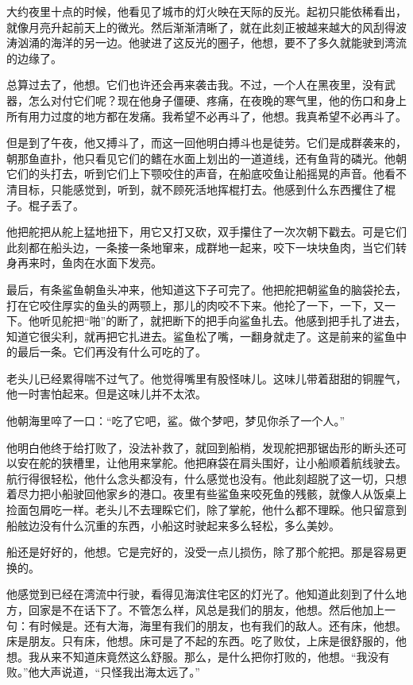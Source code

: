 \documentclass[12pt,UTF-8,openany]{ctexbook}
\begin{document}
\begin{large}
    大约夜里十点的时候，他看见了城市的灯火映在天际的反光。起初只能依稀看出，就像月亮升起前天上的微光。然后渐渐清晰了，就在此刻正被越来越大的风刮得波涛汹涌的海洋的另一边。他驶进了这反光的圈子，他想，要不了多久就能驶到湾流的边缘了。
    
    总算过去了，他想。它们也许还会再来袭击我。不过，一个人在黑夜里，没有武器，怎么对付它们呢？现在他身子僵硬、疼痛，在夜晚的寒气里，他的伤口和身上所有用力过度的地方都在发痛。我希望不必再斗了，他想。我真希望不必再斗了。
    
    但是到了午夜，他又搏斗了，而这一回他明白搏斗也是徒劳。它们是成群袭来的，朝那鱼直扑，他只看见它们的鳍在水面上划出的一道道线，还有鱼背的磷光。他朝它们的头打去，听到它们上下颚咬住的声音，在船底咬鱼让船摇晃的声音。他看不清目标，只能感觉到，听到，就不顾死活地挥棍打去。他感到什么东西攫住了棍子。棍子丢了。
    
    他把舵把从舵上猛地扭下，用它又打又砍，双手攥住了一次次朝下戳去。可是它们此刻都在船头边，一条接一条地窜来，成群地一起来，咬下一块块鱼肉，当它们转身再来时，鱼肉在水面下发亮。
    
    最后，有条鲨鱼朝鱼头冲来，他知道这下子可完了。他把舵把朝鲨鱼的脑袋抡去，打在它咬住厚实的鱼头的两颚上，那儿的肉咬不下来。他抡了一下，一下，又一下。他听见舵把“啪”的断了，就把断下的把手向鲨鱼扎去。他感到把手扎了进去，知道它很尖利，就再把它扎进去。鲨鱼松了嘴，一翻身就走了。这是前来的鲨鱼中的最后一条。它们再没有什么可吃的了。
    
    老头儿已经累得喘不过气了。他觉得嘴里有股怪味儿。这味儿带着甜甜的铜腥气，他一时害怕起来。但是这味儿并不太浓。
    
    他朝海里啐了一口：“吃了它吧，鲨。做个梦吧，梦见你杀了一个人。”
    
    他明白他终于给打败了，没法补救了，就回到船梢，发现舵把那锯齿形的断头还可以安在舵的狭槽里，让他用来掌舵。他把麻袋在肩头围好，让小船顺着航线驶去。航行得很轻松，他什么念头都没有，什么感觉也没有。他此刻超脱了这一切，只想着尽力把小船驶回他家乡的港口。夜里有些鲨鱼来咬死鱼的残骸，就像人从饭桌上捡面包屑吃一样。老头儿不去理睬它们，除了掌舵，他什么都不理睬。他只留意到船舷边没有什么沉重的东西，小船这时驶起来多么轻松，多么美妙。
    
    船还是好好的，他想。它是完好的，没受一点儿损伤，除了那个舵把。那是容易更换的。
    
    他感觉到已经在湾流中行驶，看得见海滨住宅区的灯光了。他知道此刻到了什么地方，回家是不在话下了。不管怎么样，风总是我们的朋友，他想。然后他加上一句：有时候是。还有大海，海里有我们的朋友，也有我们的敌人。还有床，他想。床是朋友。只有床，他想。床可是了不起的东西。吃了败仗，上床是很舒服的，他想。我从来不知道床竟然这么舒服。那么，是什么把你打败的，他想。“我没有败。”他大声说道，“只怪我出海太远了。”
    

\end{large}
\end{document}
